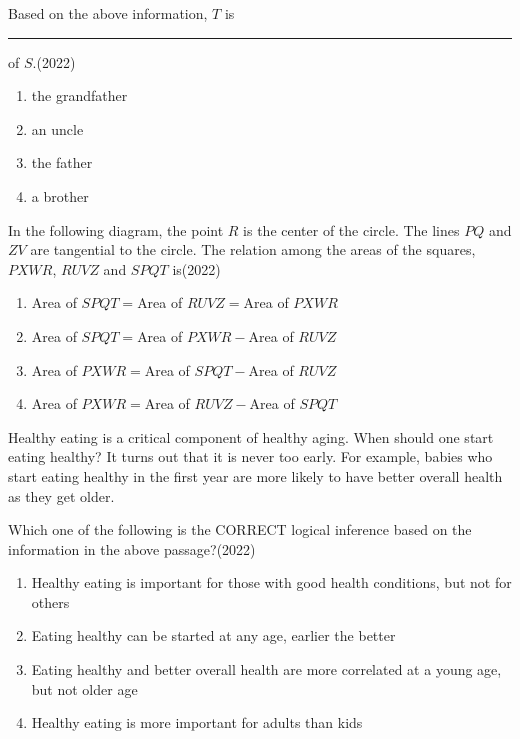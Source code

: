 Based on the above information, $T$ is \rule{1cm}{0.15mm} of $S$.\hfill(2022)
\begin{multicols}{2}
\begin{enumerate}
\item the grandfather
\item an uncle
\item the father
\item a brother
\end{enumerate}
\end{multicols}


\item In the following diagram, the point $R$ is the center of the circle. The lines $PQ$ and $ZV$ are tangential to the circle. The relation among the areas of the squares, $PXWR$, $RUVZ$ and $SPQT$ is\hfill(2022)


\begin{enumerate}
\item Area of $SPQT=$Area of $RUVZ=$Area of $PXWR$
\item Area of $SPQT=$Area of $PXWR-$Area of $RUVZ$
\item Area of $PXWR=$Area of $SPQT-$Area of $RUVZ$
\item Area of $PXWR=$Area of $RUVZ-$Area of $SPQT$
\end{enumerate}


\item Healthy eating is a critical component of healthy aging. When should one start eating healthy? It turns out that it is never too early. For example, babies who start eating healthy in the first year are more likely to have better overall health as they get older.

Which one of the following is the CORRECT logical inference based on the information in the above passage?\hfill(2022)
\begin{enumerate}
\item Healthy eating is important for those with good health conditions, but not for others
\item Eating healthy can be started at any age, earlier the better
\item Eating healthy and better overall health are more correlated at a young age, but not older age
\item Healthy eating is more important for adults than kids
\end{enumerate}


